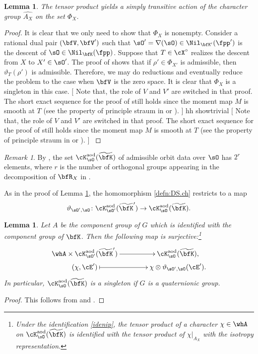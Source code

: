 \documentclass[12pt,a4paper]{amsart}
\newcommand{\trivial}[2][]{\if\relax\detokenize{#1}\relax
  {%
      \color{orange} \vspace{0em} $[$  #2 $]$
      \color{black}
  }
  \else
\ifx#1h
\ifcsname showtrivial\endcsname
{%
    \color{orange} \vspace{0em}  $[$ #2 $]$
    \color{black}
}
\fi
\else {\red Wrong argument!} \fi
\fi
}
\def\DD{\nabla}
\numberwithin{equation}{section}
\newtheorem{lem}[thm]{Lemma}
\theoremstyle{remark}
\newtheorem*{remark}{Remark}
\def\wtbfK{\widetilde{\bfK}}
\def\Xo{\cX^\circ}
\def\dliftv{\vartheta}
\def\cKaod{\cK^{\mathrm{aod}}}
\begin{document}
\begin{lem}\label{lem:Kaod}
  The tensor product yields a simply transitive action of the character group
  $\widehat{A_X}$ on the set $\Phi_X$.
\end{lem}
\begin{proof}
  It is clear that we only need to show that $\Phi_X$ is nonempty. Consider a
  rational dual pair $(\bfV,\bfV')$ such that
  $\sO' = \DD(\sO) \in \Nil_{\bfK'}(\fpp')$ is the descent of
  $\sO\in \Nil_{\bfK}(\fpp)$. Suppose that $T\in \Xo$ realizes the descent from
  $X$ to $X'\in \sO'$. The proof of \cite[Proposition~6.1]{LM} shows that if
  $\rho'\in \Phi_{X'}$ is admissible, then $\dliftv_T(\rho')$ is
  admissible.
  Therefore, we may do reductions and eventually reduce the problem
  to the case when $\bfV$ is the zero space.  It is clear that $\Phi_X$ is a
  singleton in this case.
  \trivial[h]{
    Note that, the role of $V$ and $V'$ are switched in that proof.
    The short exact sequence for the proof of \cite[(23)]{LM} still
    holds since the moment map $M$ is smooth at
    $T$ (see the property of principle straum in \cite[page 217]{PV} or
    \Cref{sec:Sdes}).
  }
\end{proof}

\begin{remark}
By , the set $\cKaod_\sO(\wtbfK)$ of admissible orbit data over
$\sO$ has $2^r$ elements, where $r$ is the number of orthogonal groups appearing in the decomposition
of $\bfR_X$ in .
\end{remark}

As in the proof of Lemma \ref{lem:Kaod},
the homomorphism \eqref{defn:DS.ch} restricts to a map
\begin{equation}\label{eq:l.adm}
  \dliftv_{\sO',\sO}\colon \cKaod_{\sO'}(\wtbfK') \rightarrow \cKaod_{\sO}(\wtbfK).
\end{equation}

\medskip

\begin{lem}\label{lem:admchar.surj}
  Let $A$ be the component group of $G$ which is identified with the component
  group of $\bfK$.  Then the following map is
  surjective:\footnote{%
    Under the identification \eqref{idenip}, the tensor product of a character
    $\chi\in \whA$ on $\cKaod_{\sO}(\wtbfK)$ is identified with the tensor
    product of $\chi|_{A_X}$ with the isotropy representation.}
  \[
    \xymatrix@C=4em@R=0em{
      \whA \times \cKaod_{\sO'}(\wtbfK')\ar[r] & \cKaod_{\sO}(\wtbfK),\\
      (\chi,\cE') \ar@{|->}[r] & \chi \otimes \dliftv_{\sO',\sO}(\cE').  }
  \]
  In particular, $\cKaod_{\sO}(\wtbfK)$ is a singleton if $G$ is a quaternionic
  group.
\end{lem}
\begin{proof}
  This follows from  and .
\end{proof}
\end{document}

